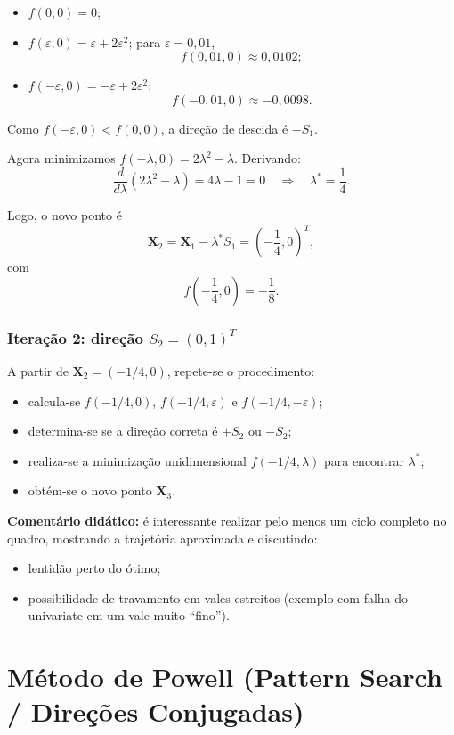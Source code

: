 \documentclass[9pt,a4paper]{extarticle}
\begin{document}
\begin{itemize}
    \item $f(0,0) = 0$;
    \item $f(\varepsilon,0) = \varepsilon + 2\varepsilon^2$; para $\varepsilon = 0{,}01$,
    \[
        f(0{,}01,0) \approx 0{,}0102;
    \]
    \item $f(-\varepsilon,0) = -\varepsilon + 2\varepsilon^2$;
    \[
        f(-0{,}01,0) \approx -0{,}0098.
    \]
\end{itemize}

Como $f(-\varepsilon,0) < f(0,0)$, a direção de descida é $-S_1$.

Agora minimizamos $f(-\lambda,0) = 2\lambda^2 - \lambda$. Derivando:
\[
    \frac{d}{d\lambda} (2\lambda^2 - \lambda) = 4\lambda - 1 = 0
    \quad\Rightarrow\quad
    \lambda^\ast = \frac{1}{4}.
\]

Logo, o novo ponto é
\[
    \bm{X}_2 = \bm{X}_1 - \lambda^\ast S_1 = \left(-\frac{1}{4}, 0\right)^T,
\]
com
\[
    f\left(-\frac{1}{4},0\right) = -\frac{1}{8}.
\]

\subsubsection*{Iteração 2: direção $S_2 = (0,1)^T$}

A partir de $\bm{X}_2 = (-1/4,0)$, repete-se o procedimento:
\begin{itemize}
    \item calcula-se $f(-1/4,0)$, $f(-1/4,\varepsilon)$ e $f(-1/4,-\varepsilon)$;
    \item determina-se se a direção correta é $+S_2$ ou $-S_2$;
    \item realiza-se a minimização unidimensional $f(-1/4, \lambda)$ para encontrar $\lambda^\ast$;
    \item obtém-se o novo ponto $\bm{X}_3$.
\end{itemize}

\textbf{Comentário didático:} é interessante realizar pelo menos um ciclo completo no quadro, mostrando a trajetória aproximada e discutindo:
\begin{itemize}
    \item lentidão perto do ótimo;
    \item possibilidade de travamento em vales estreitos (exemplo com falha do univariate em um vale muito “fino”).
\end{itemize}

\section{Método de Powell (Pattern Search / Direções Conjugadas)}
\end{document}
